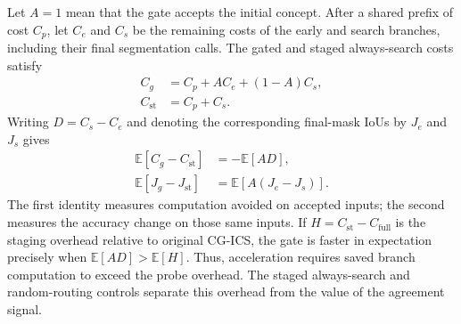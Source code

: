 Let $A=1$ mean that the gate accepts the initial concept. After a shared
prefix of cost $C_p$, let $C_e$ and $C_s$ be the remaining costs of the
early and search branches, including their final segmentation calls.
The gated and staged always-search costs satisfy
\begin{equation}
  \begin{aligned}
  C_g&=C_p+A C_e+(1-A)C_s,\\
  C_{\mathrm{st}}&=C_p+C_s.
  \end{aligned}
  \label{eq:gate-cost}
\end{equation}
Writing $D=C_s-C_e$ and denoting the corresponding final-mask IoUs by
$J_e$ and $J_s$ gives
\begin{equation}
  \begin{aligned}
  \mathbb{E}[C_g-C_{\mathrm{st}}]&=-\mathbb{E}[A D],\\
  \mathbb{E}[J_g-J_{\mathrm{st}}]&=\mathbb{E}[A(J_e-J_s)].
  \end{aligned}
  \label{eq:gate-decomposition}
\end{equation}
The first identity measures computation avoided on accepted inputs;
the second measures the accuracy change on those same inputs. If
$H=C_{\mathrm{st}}-C_{\mathrm{full}}$ is the staging overhead relative to
original CG-ICS, the gate is faster in expectation precisely when
$\mathbb{E}[A D]>\mathbb{E}[H]$. Thus, acceleration requires saved branch computation to exceed the
probe overhead. The staged always-search and random-routing controls
separate this overhead from the value of the agreement signal.

